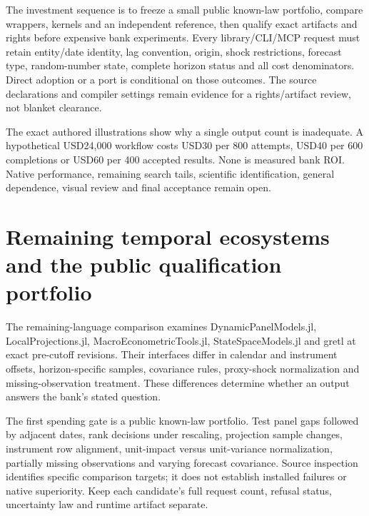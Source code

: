 The investment sequence is to freeze a small public known-law portfolio,
compare wrappers, kernels and an independent reference, then qualify
exact artifacts and rights before expensive bank experiments. Every
library/CLI/MCP request must retain entity/date identity, lag
convention, origin, shock restrictions, forecast type, random-number
state, complete horizon status and all cost denominators. Direct
adoption or a port is conditional on those outcomes. The source
declarations and compiler settings remain evidence for a rights/artifact
review, not blanket clearance. \citep{exec25_cdyn_choice}

The exact authored illustrations show why a single output count is
inadequate. A hypothetical USD24,000 workflow costs USD30 per 800
attempts, USD40 per 600 completions or USD60 per 400 accepted results.
None is measured bank ROI. Native performance, remaining search tails,
scientific identification, general dependence, visual review and final
acceptance remain open. \citep{exec25_cdyn_choice}

\hypertarget{remaining-temporal-ecosystems-and-the-public-qualification-portfolio}{%
\section{Remaining temporal ecosystems and the public qualification
portfolio}\label{remaining-temporal-ecosystems-and-the-public-qualification-portfolio}}

The remaining-language comparison examines DynamicPanelModels.jl,
LocalProjections.jl, MacroEconometricTools.jl, StateSpaceModels.jl and
gretl at exact pre-cutoff revisions. Their interfaces differ in calendar
and instrument offsets, horizon-specific samples, covariance rules,
proxy-shock normalization and missing-observation treatment. These
differences determine whether an output answers the bank's stated
question.
\citep{exec25_odyn_dpm,exec25_odyn_lp,exec25_odyn_macro,exec25_odyn_ssm,exec25_odyn_gretl}

The first spending gate is a public known-law portfolio. Test panel gaps
followed by adjacent dates, rank decisions under rescaling, projection
sample changes, instrument row alignment, unit-impact versus
unit-variance normalization, partially missing observations and varying
forecast covariance. Source inspection identifies specific comparison
targets; it does not establish installed failures or native superiority.
Keep each candidate's full request count, refusal status, uncertainty
law and runtime artifact separate. \citep{exec25_odyn_choice}


